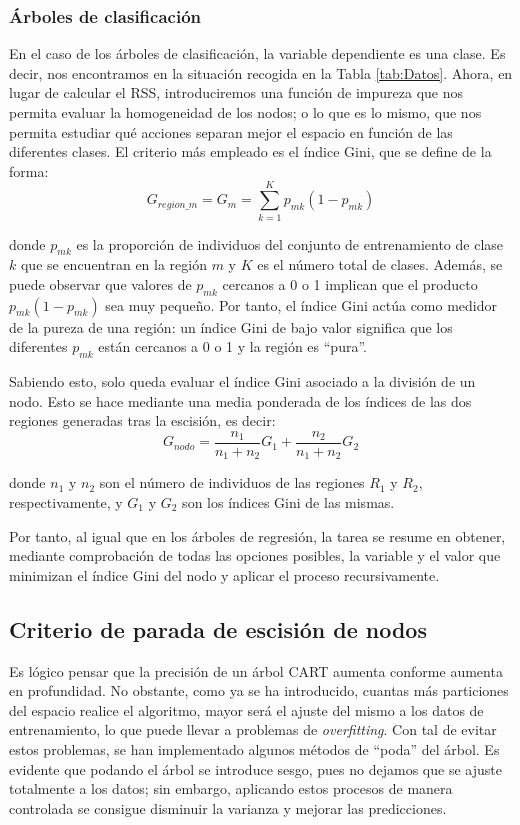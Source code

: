 \documentclass[12pt,twoside]{article}
\begin{document}
\subsubsection*{Árboles de clasificación}
En el caso de los árboles de clasificación, la variable dependiente es una clase. Es decir, nos encontramos en la situación recogida en la Tabla \ref{tab:Datos}. Ahora, en lugar de calcular el RSS, introduciremos una función de impureza que nos permita evaluar la homogeneidad de los nodos; o lo que es lo mismo, que nos permita estudiar qué acciones separan mejor el espacio en función de las diferentes clases. El criterio más empleado es el índice Gini, que se define de la forma:
\begin{equation*}
G_{region\_m} = G_m = \sum_{k=1}^K p_{mk}(1 - p_{mk})
\end{equation*}

\noindent
donde $p_{mk}$ es la proporción de individuos del conjunto de entrenamiento de clase $k$ que se encuentran en la región $m$ y $K$ es el número total de clases. Además, se puede observar que valores de $p_{mk}$ cercanos a 0 o 1 implican que el producto $p_{mk}(1- p_{mk})$ sea muy pequeño. Por tanto, el índice Gini actúa como medidor de la pureza de una región: un índice Gini de bajo valor significa que los diferentes $p_{mk}$ están cercanos a 0 o 1 y la región es ``pura''.

Sabiendo esto, solo queda evaluar el índice Gini asociado a la división de un nodo. Esto se hace mediante una media ponderada de los índices de las dos regiones generadas tras la escisión, es decir:
\begin{equation*}
G_{nodo} = \frac{n_1}{n_1 + n_2}G_1 + \frac{n_2}{n_1 + n_2}G_2
\end{equation*}

\noindent
donde  $n_1$ y $n_2$ son el número de individuos de las regiones $R_1$ y $R_2$, respectivamente, y $G_1$ y $G_2$ son los índices Gini de las mismas. 

Por tanto, al igual que en los árboles de regresión, la tarea se resume en obtener, mediante comprobación de todas las opciones posibles, la variable y el valor que minimizan el índice Gini del nodo y aplicar el proceso recursivamente.




\subsection{Criterio de parada de escisión de nodos}
Es lógico pensar que la precisión de un árbol CART aumenta conforme aumenta en profundidad. No obstante, como ya se ha introducido, cuantas más particiones del espacio realice el algoritmo, mayor será el ajuste del mismo a los datos de entrenamiento, lo que puede llevar a problemas de \textit{overfitting}. Con tal de evitar estos problemas, se han implementado algunos métodos de ``poda'' del árbol. Es evidente que podando el árbol se introduce sesgo, pues no dejamos que se ajuste totalmente a los datos; sin embargo, aplicando estos procesos de manera controlada se consigue disminuir la varianza y mejorar las predicciones.
\end{document}
